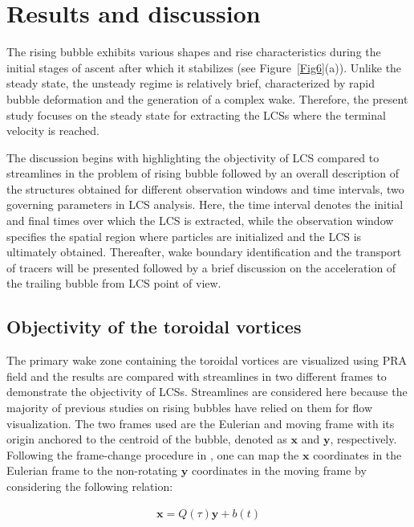 \documentclass[aps,prfluids,reprint,nofootinbib,onecolumn,groupedaddress,showkeys]{revtex4-2}
\begin{document}
	\section{Results and discussion}
	\label{Results and discussion}
	
	The rising bubble exhibits various shapes and rise characteristics during the initial stages of ascent after which it stabilizes (see Figure~\ref{Fig6}(a)). Unlike the steady state, the unsteady regime is relatively brief, characterized by rapid bubble deformation and the generation of a complex wake. Therefore, the present study focuses on the steady state for extracting the LCSs where the terminal velocity is reached. 
	
	The discussion begins with highlighting the objectivity of LCS compared to streamlines in the problem of rising bubble followed by an overall description of the structures obtained for different observation windows and time intervals, two governing parameters in LCS analysis. Here, the time interval denotes the initial and final times over which the LCS is extracted, while the observation window specifies the spatial region where particles are initialized and the LCS is ultimately obtained. Thereafter, wake boundary identification and the transport of tracers will be presented followed by a brief discussion on the acceleration of the trailing bubble from LCS point of view.
	
	\subsection{Objectivity of the toroidal vortices}
	\label{Primary wake}
	
	The primary wake zone containing the toroidal vortices are visualized using PRA field and the results are compared with streamlines in two different frames to demonstrate the objectivity of LCSs. Streamlines are considered here because the majority of previous studies on rising bubbles have relied on them for flow visualization. The two frames used are the Eulerian and {\color{black}moving} frame with its origin anchored to the centroid of the bubble, denoted as $\mathbf{x}$ and $\mathbf{y}$, respectively. Following the frame-change procedure in \cite{Haller2023}, one can map the $\mathbf{x}$ coordinates in the Eulerian frame to the {\color{black}non-rotating} $\mathbf{y}$ coordinates in the {\color{black}moving} frame by considering the following relation:
	
	\begin{align}
		\mathbf{x}= Q(\tau)\mathbf{y} + b(t)
		\label{eq 5} 
	\end{align}
	
\end{document}
